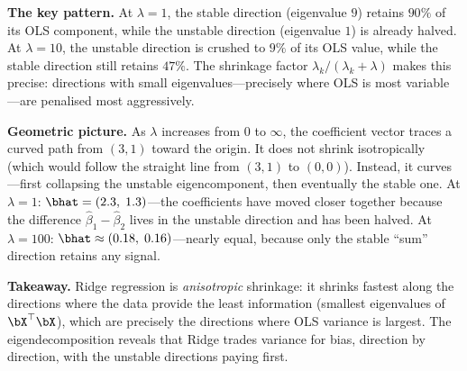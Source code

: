 \begin{example}
\medskip\noindent\textbf{The key pattern.}
At $\lambda=1$, the stable direction (eigenvalue $9$) retains $90\%$ of its OLS
component, while the unstable direction (eigenvalue $1$) is already halved.
At $\lambda=10$, the unstable direction is crushed to $9\%$ of its OLS value,
while the stable direction still retains $47\%$.
The shrinkage factor $\lambda_k/(\lambda_k+\lambda)$ makes this precise:
directions with small eigenvalues---precisely where OLS is most
variable---are penalised most aggressively.

\medskip\noindent\textbf{Geometric picture.}
As $\lambda$ increases from $0$ to $\infty$, the coefficient vector traces a curved
path from $(3,1)$ toward the origin.
It does not shrink isotropically (which would follow the straight line
from $(3,1)$ to $(0,0)$). Instead, it curves---first collapsing the unstable
eigencomponent, then eventually the stable one.
At $\lambda=1$: $\bhat = (2.3,\;1.3)$---the coefficients have moved closer together
because the difference $\hat\beta_1-\hat\beta_2$ lives in the unstable direction
and has been halved.
At $\lambda=100$: $\bhat \approx (0.18,\;0.16)$---nearly equal, because only the
stable ``sum'' direction retains any signal.

\medskip\noindent\textbf{Takeaway.}
Ridge regression is \emph{anisotropic} shrinkage: it shrinks fastest along
the directions where the data provide the least information (smallest
eigenvalues of $\bX^\top\bX$), which are precisely the directions where OLS
variance is largest.
The eigendecomposition reveals that Ridge trades variance for bias,
direction by direction, with the unstable directions paying first.
\end{example}
